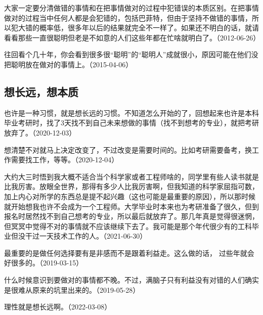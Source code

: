 大家一定要分清做错的事情和在把事情做对的过程中犯错误的本质区别。在把事情做对的过程当中任何人都是会犯错的，包括巴菲特，但由于坚持不做错的事情，所以犯大错的概率低，很多年以后的结果就完全不一样了。如果还不明白的话，就请看看那些一直很聪明但老是不如意的人们这些年都在忙啥就明白了。（2012-06-26）

往回看个几十年，你会看到很多很“聪明”的“聪明人”成就很小，原因可能在他们没把聪明放在做对的事情上。（2015-04-06）

\subsection{想长远，想本质}


也许是一种习惯，就是想长远的习惯。不知道怎么开始的了，回想起来也许是本科毕业考研时，找了3天找不到自己未来想做的事情（找不到想考的专业），就把考研放弃了。（2020-12-03）


想清楚不对就马上决定改变了，不过改变是需要时间的。比如考研需要备考，换工作需要找工作，等等。（2020-12-04）

大约大三时悟到我大概不适合当个科学家或者工程师啥的，同学里有些人读书就是比我厉害。放眼全世界，那得有多少人比我厉害啊，但我知道的科学家屈指可数，加上内心对所学的东西总是提不起兴趣（这也可能是最重要的原因），所以那时候就开始想我也许不会成为一个工程师。大学毕业时本来也为考研准备了很久，但到报名时居然找不到自己想考的专业，所以最后就放弃了。那几年真是觉得很迷惘，但冥冥中觉得不对的事情就不应该继续下去了。我可能是那个年代很少有的工科毕业但没干过一天技术工作的人。（2021-06-30）


最重要的是做任何选择要有是非感而不是跟着利益走。这么做的话， 过些年就会好很多的。（2019-03-15）

什么时候意识到要做对的事情都不晚。不过，满脑子只有利益没有对错的人们确实是很难从原来的坑里出来的。（2019-05-28）


理性就是想长远啊。（2022-03-08）


